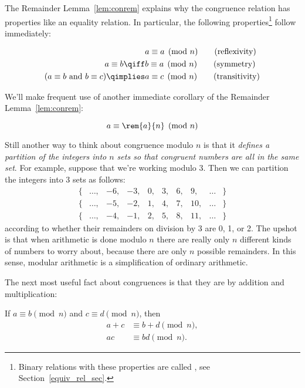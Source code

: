 The Remainder Lemma~\ref{lem:conrem} explains why the congruence
relation has properties like an equality relation.  In particular, the
following properties\footnote{Binary relations with these properties
  are called \emph{}, see
  Section~\ref{equiv_rel_sec}.}  follow immediately:
\begin{lemma}\label{mod_equiv_rel_lem} \mbox{}
\begin{align}
                 & a \equiv a \pmod{n}\tag{reflexivity}\\
a \equiv b
  \qiff & b \equiv a \pmod{n} \tag{symmetry}\\
(a \equiv b \text{ and
  } b \equiv c) \qimplies & a \equiv c \pmod{n} \tag{transitivity}
\end{align}
\end{lemma}

We'll make frequent use of another immediate corollary of the
Remainder Lemma~\ref{lem:conrem}:
\begin{corollary}\label{aran}
\[
a \equiv \rem{a}{n} \pmod{n}
\]
\end{corollary}

Still another way to think about congruence modulo $n$ is that it
\emph{defines a partition of the integers into $n$ sets so that
  congruent numbers are all in the same set}.  For example, suppose
that we're working modulo 3.  Then we can partition the integers into
3 sets as follows:
\[
\begin{array}{cccccccccc}
\{ & \dots, & -6, & -3, & 0, & 3, & 6, & 9, & \dots & \} \\
\{ &
\dots, & -5, & -2, & 1, & 4, & 7, & 10, & \dots & \} \\
\{ & \dots, &
-4, & -1, & 2, & 5, & 8, & 11, & \dots & \}
\end{array}
\]
according to whether their remainders on division by 3 are 0, 1, or 2.
The upshot is that when arithmetic is done modulo $n$ there are really
only $n$ different kinds of numbers to worry about, because there are
only $n$ possible remainders.  In this sense, modular arithmetic is a
simplification of ordinary arithmetic.\iffalse and thus is a good
reasoning tool.\fi

The next most useful fact about congruences is that they are
 by addition and multiplication:

\begin{lemma}[Congruence]\label{mod_congruence_lem}  If
$a \equiv b \pmod{n}$ and $c \equiv d \pmod{n}$, then
\begin{align}
a + c & \equiv b + d \pmod{n},\label{mod_congruence_lem+}\\
a c   & \equiv b d   \pmod{n}.\label{mod_congruence_lem*}
\end{align}
\end{lemma}

